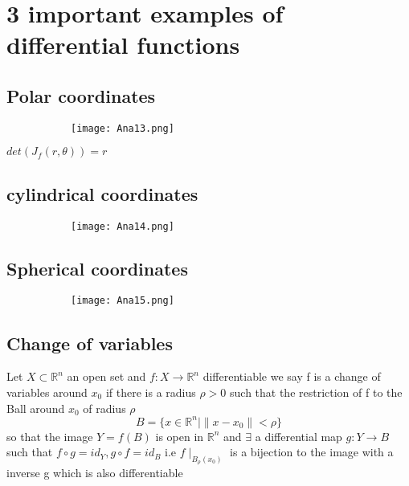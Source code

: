 \documentclass[8pt]{extreport}
\newcommand{\R}{\mathbb{R}}
\begin{document}
\section{3 important examples of differential functions}

\subsection{Polar coordinates}

\begin{figure}[H]
\centering
\begin{subfigure}[b]{0.4\linewidth}
\texttt{[image: Ana13.png]}
\end{subfigure}
\end{figure}
$det(J_f(r, \theta)) = r$
\subsection{cylindrical coordinates}
\begin{figure}[H]
\centering
\begin{subfigure}[b]{0.4\linewidth}
\texttt{[image: Ana14.png]}
\end{subfigure}
\end{figure}
\subsection{Spherical coordinates}
\begin{figure}[H]
\centering
\begin{subfigure}[b]{0.4\linewidth}
\texttt{[image: Ana15.png]}
\end{subfigure}
\end{figure}

\subsection{Change of variables}
Let $X \subset \R^n$ an open set and $f:X \to \R^n$ differentiable we say f is a change of variables around $x_0$ if there is a radius $\rho >0$ such that the restriction of f to the Ball around $x_0$ of radius $\rho$ 
$$ B = \{x \in \R^n \mid \|x-x_0\| < \rho \}$$
so that the image $Y =f(B)$ is open in $\R^n$ and $\exists$ a differential map $g:Y \to B$ such that $f \circ g = id_Y, g \circ f = id_B$ i.e $f\mid_{B_\rho(x_0)}$ is a bijection to the image with a inverse g which is also differentiable
\end{document}
